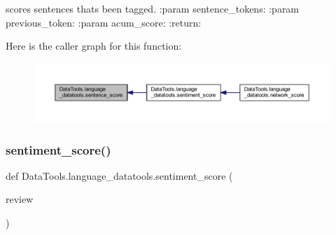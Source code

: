 \begin{DoxyVerb}    scores sentences thats been tagged.
:param sentence_tokens:
:param previous_token:
:param acum_score:
:return:
\end{DoxyVerb}
 Here is the caller graph for this function\+:
\nopagebreak
\begin{figure}[H]
\begin{center}
\leavevmode
\includegraphics[width=350pt]{namespace_data_tools_1_1language__datatools_abe2e77093c7288b7daf9baa62399f77b_icgraph}
\end{center}
\end{figure}
\mbox{\label{namespace_data_tools_1_1language__datatools_a18ef589c882e116d6547b6e5919e3a3a}} 
\subsubsection{\texorpdfstring{sentiment\+\_\+score()}{sentiment\_score()}}
{\footnotesize\ttfamily def Data\+Tools.\+language\+\_\+datatools.\+sentiment\+\_\+score (\begin{DoxyParamCaption}\item[{}]{review }\end{DoxyParamCaption})}

